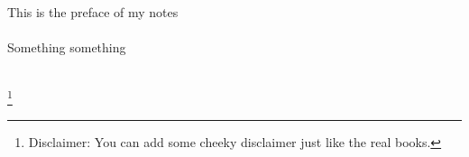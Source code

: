 \documentclass[letterpaper,10pt,twoside,twocolumn,openany]{book}
\begin{document}
\frontmatter                           
\begin{titlepage}	    
  ~
  \newpage

  \begin{center}


    \large
    \vspace*{\fill}
    This is the preface of my notes
    \\~\\ 
    Something something
    \\~\\
    \vspace*{\fill}

  \end{center}
  \let\thefootnote\relax\footnote{Disclaimer: You can add some cheeky disclaimer just like the real books.}
\end{titlepage}
\end{document}
